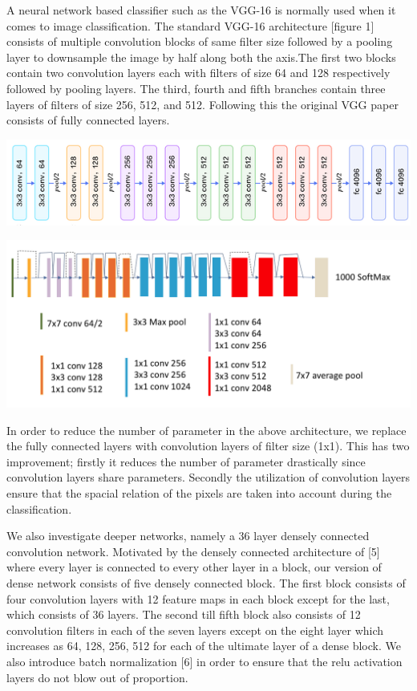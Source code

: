 \documentclass{article}
\begin{document}
A neural network based classifier such as the VGG-16 is normally used when it comes to image classification. The standard VGG-16 architecture [figure 1] consists of 
multiple convolution blocks of same filter size followed by a pooling layer to downsample the image by half along both the axis.The first two blocks contain two convolution layers each with filters of size 64 and 128 respectively followed by pooling layers. The third, fourth and fifth branches contain three layers of filters of size 256, 512, and 512. Following this the original VGG paper consists of fully connected layers.
\begin{center}
	\includegraphics[width=\textwidth]{vgg_16_baseline}
\end{center}
\begin{center}
	\includegraphics[width=\textwidth]{resnet50}
\end{center} 


In order to reduce the number of parameter in the above architecture, we replace the fully connected layers with convolution layers of filter size (1x1). This has two improvement; firstly it reduces the number of parameter drastically since convolution layers share parameters. Secondly the utilization of convolution layers ensure that the spacial relation of the pixels are taken into account during the classification.

We also investigate deeper networks, namely a 36 layer densely connected convolution network. Motivated by the densely connected architecture of [5] where every layer is connected to every other layer in a block, our version of dense network consists of five densely connected block. The first block consists of four convolution layers with 12 feature maps in each block except for the last, which consists of 36 layers. The second till fifth block also consists of 12 convolution filters in each of the seven layers except on the eight layer which increases as 64, 128, 256, 512 for each of the ultimate layer of a dense block. We also introduce batch normalization [6] in order to ensure that the relu activation layers do not blow out of proportion. 
\end{document}
